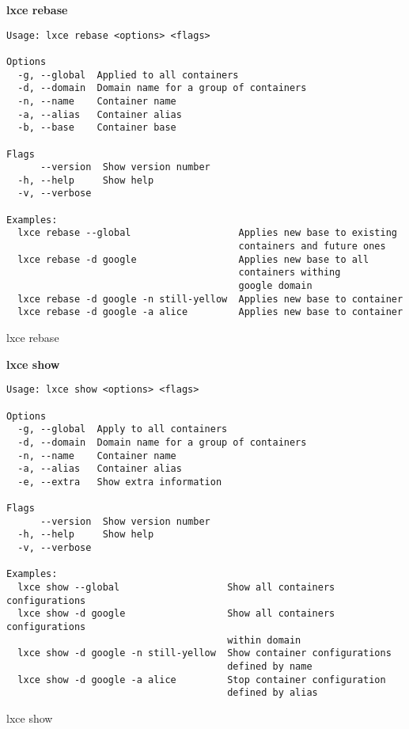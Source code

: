 \newpage
\textbf{lxce rebase}
\begin{listing}[H]
\begin{verbatim}
Usage: lxce rebase <options> <flags>

Options
  -g, --global  Applied to all containers                              
  -d, --domain  Domain name for a group of containers                  
  -n, --name    Container name                                         
  -a, --alias   Container alias                                        
  -b, --base    Container base                               

Flags
      --version  Show version number                                   
  -h, --help     Show help                                             
  -v, --verbose

Examples:
  lxce rebase --global                   Applies new base to existing 
                                         containers and future ones
  lxce rebase -d google                  Applies new base to all
                                         containers withing 
                                         google domain
  lxce rebase -d google -n still-yellow  Applies new base to container 
  lxce rebase -d google -a alice         Applies new base to container 
\end{verbatim}
\caption{lxce rebase}
\label{listings: lxce rebase}
\end{listing}

\newpage
\textbf{lxce show}
\begin{listing}[H]
\begin{verbatim}
Usage: lxce show <options> <flags>

Options
  -g, --global  Apply to all containers                                
  -d, --domain  Domain name for a group of containers                  
  -n, --name    Container name                                         
  -a, --alias   Container alias                                        
  -e, --extra   Show extra information                

Flags
      --version  Show version number                                   
  -h, --help     Show help                                             
  -v, --verbose

Examples:
  lxce show --global                   Show all containers configurations
  lxce show -d google                  Show all containers configurations 
                                       within domain
  lxce show -d google -n still-yellow  Show container configurations 
                                       defined by name
  lxce show -d google -a alice         Stop container configuration 
                                       defined by alias
\end{verbatim}
\caption{lxce show}
\label{listings: lxce show}
\end{listing}

